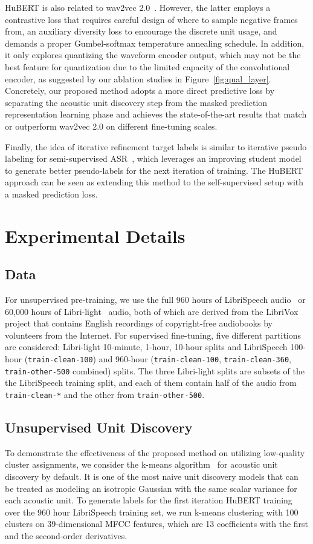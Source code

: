 HuBERT is also related to wav2vec 2.0~\cite{baevski2020wav2vec}. However, the latter employs a contrastive loss that requires careful design of where to sample negative frames from, an auxiliary diversity loss to encourage the discrete unit usage, and demands a proper Gumbel-softmax temperature annealing schedule. In addition, it only explores quantizing the waveform encoder output, which may not be the best feature for quantization due to the limited capacity of the convolutional encoder, as suggested by our ablation studies in Figure~\ref{fig:qual_layer}. Concretely, our proposed method adopts a more direct predictive loss by separating the acoustic unit discovery step from the masked prediction representation learning phase and achieves the state-of-the-art results that match or outperform wav2vec 2.0 on different fine-tuning scales.

Finally, the idea of iterative refinement target labels is similar to iterative pseudo labeling for semi-supervised ASR~\cite{xu2020iterative, likhomanenko2020slimipl}, which leverages an improving student model to generate better pseudo-labels for the next iteration of training. The HuBERT approach can be seen as extending this method to the self-supervised setup with a masked prediction loss.\section{Experimental Details}

\subsection{Data}\label{sec:data}
For unsupervised pre-training, we use the full 960 hours of LibriSpeech audio~\cite{panayotov2015librispeech} or 60,000 hours of Libri-light~\cite{kahn2020libri} audio, both of which are derived from the LibriVox project that contains English recordings of copyright-free audiobooks by volunteers from the Internet.
For supervised fine-tuning, five different partitions are considered: Libri-light 10-minute, 1-hour, 10-hour splits and LibriSpeech 100-hour (\texttt{train-clean-100}) and 960-hour (\texttt{train-clean-100}, \texttt{train-clean-360}, \texttt{train-other-500} combined) splits. The three Libri-light splits are subsets of the the LibriSpeech training split, and each of them contain half of the audio from \texttt{train-clean-*} and the other from \texttt{train-other-500}.

\subsection{Unsupervised Unit Discovery}
To demonstrate the effectiveness of the proposed method on utilizing low-quality cluster assignments, we consider the k-means algorithm~\cite{lloyd1982least} for acoustic unit discovery by default. It is one of the most naive unit discovery models that can be treated as modeling an isotropic Gaussian with the same scalar variance for each acoustic unit.
To generate labels for the first iteration HuBERT training over the 960 hour LibriSpeech training set, we run k-means clustering with 100 clusters on 39-dimensional MFCC features, which are 13 coefficients with the first and the second-order derivatives.

